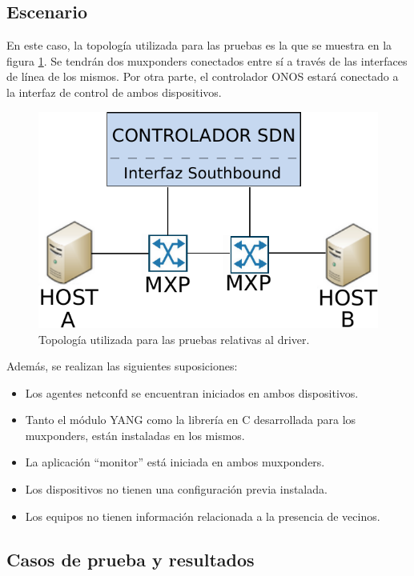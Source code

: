 \subsection{Escenario}

En este caso, la topología utilizada para las pruebas es la que se muestra en la figura \ref{fig:test_topo_netconf}. Se tendrán dos muxponders conectados entre sí a través de las interfaces de línea de los mismos. Por otra parte, el controlador ONOS estará conectado a la interfaz de control de ambos dispositivos. 


\begin{figure}[!h]
	\centering
	\includegraphics[scale=0.8]{Figures/topologiatest.pdf}
	\caption{Topología utilizada para las pruebas relativas al driver.}
	\label{fig:test_topo_netconf}
  \end{figure}


  Además, se realizan las siguientes suposiciones:

\begin{itemize}
	\item Los agentes netconfd se encuentran iniciados en ambos dispositivos.
    \item Tanto el módulo YANG como la librería en C desarrollada para los muxponders, están instaladas en los mismos.
    \item La aplicación “monitor” está iniciada en ambos muxponders.
    \item Los dispositivos no tienen una configuración previa instalada. 
    \item Los equipos no tienen información relacionada a la presencia de vecinos.
\end{itemize}


\subsection{Casos de prueba y resultados}

